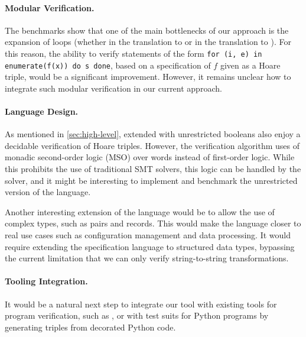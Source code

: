 \paragraph{Modular Verification.} The benchmarks show that one of the main
bottlenecks of our approach is the expansion of loops (whether in the
translation to  or in the translation to
). For this reason, the ability to verify
statements of the form \texttt{for (i, e) in enumerate(f(x)) do s done}, based
on a specification of $f$ given as a Hoare triple, would be a significant
improvement. However, it remains unclear how to integrate such modular
verification in our current approach.

\paragraph{Language Design.} As mentioned in \cref{sec:high-level},
 extended with unrestricted booleans also enjoy a decidable
verification of Hoare triples. However, the verification algorithm uses of
monadic second-order logic (MSO) over words instead of first-order logic. While
this prohibits the use of traditional SMT solvers, this logic can be handled by
the  solver, and it might be interesting to implement and benchmark
the unrestricted version of the language. 

Another interesting extension of the language would be to allow the use of
complex types, such as pairs and records. This would make the language closer
to real use cases such as configuration management and data processing. It
would require extending the specification language to structured data types,
bypassing the current limitation that we can only verify string-to-string
transformations.


\paragraph{Tooling Integration.} It would be a natural next step to integrate
our tool with existing tools for program verification, such as 
\cite{Why3}, or with test suits for Python programs by generating triples from
decorated Python code.
